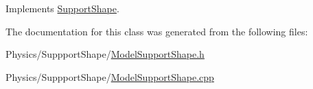 Implements \hyperlink{classSupportShape_ad6aca93d79a36c7db3a449a4364a2c1e}{Support\+Shape}.



The documentation for this class was generated from the following files\+:\begin{DoxyCompactItemize}
\item 
Physics/\+Suppport\+Shape/\hyperlink{ModelSupportShape_8h}{Model\+Support\+Shape.\+h}\item 
Physics/\+Suppport\+Shape/\hyperlink{ModelSupportShape_8cpp}{Model\+Support\+Shape.\+cpp}\end{DoxyCompactItemize}
